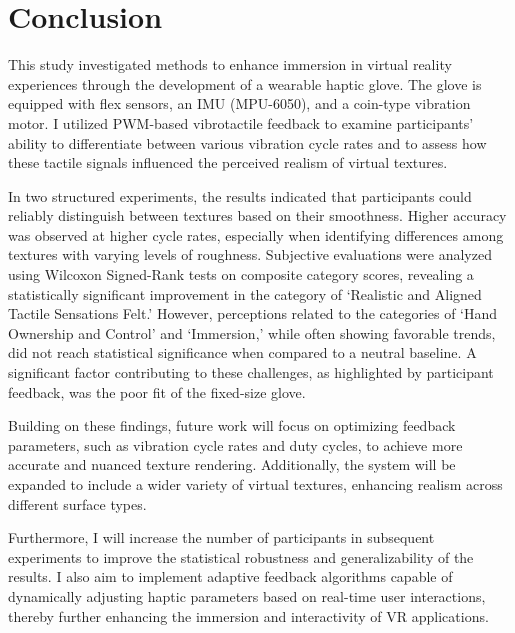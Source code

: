\chapter{Conclusion} %

\label{Chapter6}

This study investigated methods to enhance immersion in virtual reality experiences through the development of a wearable haptic glove. The glove is equipped with flex sensors, an IMU (MPU-6050), and a coin-type vibration motor. I utilized PWM-based vibrotactile feedback to examine participants' ability to differentiate between various vibration cycle rates and to assess how these tactile signals influenced the perceived realism of virtual textures.

In two structured experiments, the results indicated that participants could reliably distinguish between textures based on their smoothness. Higher accuracy was observed at higher cycle rates, especially when identifying differences among textures with varying levels of roughness. Subjective evaluations were analyzed using Wilcoxon Signed-Rank tests on composite category scores, revealing a statistically significant improvement in the category of `Realistic and Aligned Tactile Sensations Felt.' However, perceptions related to the categories of `Hand Ownership and Control' and `Immersion,' while often showing favorable trends, did not reach statistical significance when compared to a neutral baseline. A significant factor contributing to these challenges, as highlighted by participant feedback, was the poor fit of the fixed-size glove.

Building on these findings, future work will focus on optimizing feedback parameters, such as vibration cycle rates and duty cycles, to achieve more accurate and nuanced texture rendering. Additionally, the system will be expanded to include a wider variety of virtual textures, enhancing realism across different surface types. 

Furthermore, I will increase the number of participants in subsequent experiments to improve the statistical robustness and generalizability of the results. I also aim to implement adaptive feedback algorithms capable of dynamically adjusting haptic parameters based on real-time user interactions, thereby further enhancing the immersion and interactivity of VR applications.





